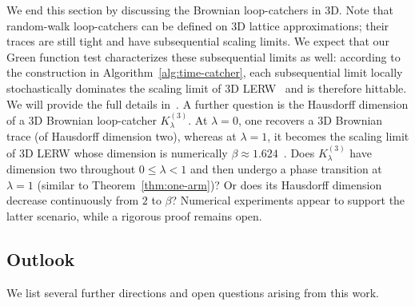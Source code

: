 \documentclass[11pt]{article}
\numberwithin{equation}{section}
\newcommand{\1}{\mathbf{1}}
\begin{document}
We end this section by discussing the Brownian loop-catchers in 3D.
Note that random-walk loop-catchers can be defined on 3D lattice approximations; their traces are still tight and have subsequential scaling limits. We expect that our Green function test characterizes these subsequential limits as well: according to the construction in Algorithm~\ref{alg:time-catcher}, each subsequential limit locally stochastically dominates the scaling limit of 3D LERW~\cite{kozma-lerw-3d,SS18} and is therefore hittable. We will provide the full details in~\cite{CCLS26}. A further question is the Hausdorff dimension of a 3D Brownian loop-catcher $K^{(3)}_\lambda$.  At $\lambda=0$, one recovers a 3D Brownian trace (of Hausdorff dimension two), whereas at $\lambda=1$, it becomes the scaling limit of 3D LERW whose dimension is numerically $\beta\approx1.624$~\cite{Wilson2010}.  Does $K^{(3)}_\lambda$ have dimension two throughout $0\leq\lambda<1$ and then undergo a phase transition at $\lambda=1$ (similar to Theorem~\ref{thm:one-arm})?  Or does its Hausdorff dimension decrease continuously from $2$ to $\beta$? Numerical experiments appear to support the latter scenario, while a rigorous proof remains open. 

\subsection{Outlook}
\label{sec:future-directions}

We list several further directions and open questions arising from this work.
\end{document}
